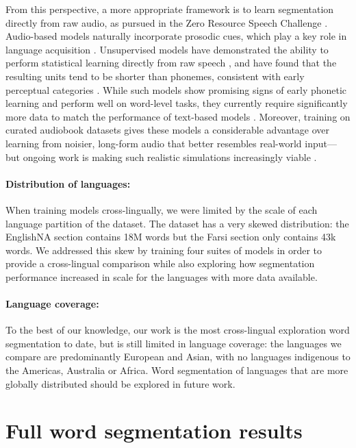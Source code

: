 From this perspective, a more appropriate framework is to learn segmentation directly from raw audio, as pursued in the Zero Resource Speech Challenge \citep{nguyen2020zero, dunbar2021zero}. Audio-based models naturally incorporate prosodic cues, which play a key role in language acquisition \citep{Cutler1987, Jusczyk1993stress, jusczyk-1999-stress-voice}. Unsupervised models have demonstrated the ability to perform statistical learning directly from raw speech \citep{lavechin2022can, seyssel-2023-realistic}, and have found that the resulting units tend to be shorter than phonemes, consistent with early perceptual categories \citep{schatz2021early}. While such models show promising signs of early phonetic learning and perform well on word-level tasks, they currently require significantly more data to match the performance of text-based models \citep{lavechin}. Moreover, training on curated audiobook datasets gives these models a considerable advantage over learning from noisier, long-form audio that better resembles real-world input—but ongoing work is making such realistic simulations increasingly viable \citep{lavechin2024modeling}.

\paragraph{Distribution of languages:} When training models cross-lingually, we were limited by the scale of each language partition of the \ipachildes dataset. The dataset has a very skewed distribution: the EnglishNA section contains 18M words but the Farsi section only contains 43k words. We addressed this skew by training four suites of models in order to provide a cross-lingual comparison while also exploring how segmentation performance increased in scale for the languages with more data available.

\paragraph{Language coverage:}
To the best of our knowledge, our work is the most cross-lingual exploration word segmentation to date, but is still limited in language coverage: the languages we compare are predominantly European and Asian, with no languages indigenous to the Americas, Australia or Africa. Word segmentation of languages that are more globally distributed should be explored in future work.

\section{Full word segmentation results}\label{app:15-othersegresults}

